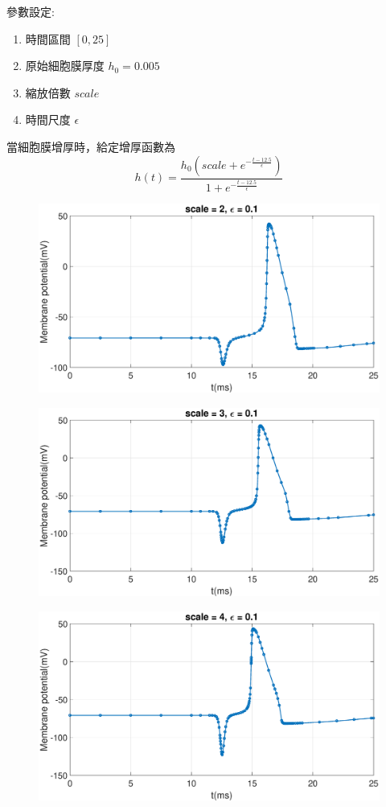 \documentclass[12pt,a4paper]{article}
\begin{document}
	\begin{CJK}{UTF8}{bsmi}
		參數設定: 
		\begin{enumerate}
			\item 時間區間 $[0,25]$
			\item 原始細胞膜厚度 $h_0=0.005$
			\item 縮放倍數 $scale$
			\item 時間尺度 $\epsilon$
		\end{enumerate}
		當細胞膜增厚時，給定增厚函數為
		$$h(t)=\frac{h_0(scale+e^{-\frac{t-12.5}{\epsilon}})}{1+e^{-\frac{t-12.5}{\epsilon}}}$$
		\begin{figure}[htbp]
			\centering
			\includegraphics[width = 500pt]{21.eps}
		\end{figure}
		\begin{figure}[htbp]
			\centering
			\includegraphics[width = 500pt]{31.eps}
		\end{figure}
		\begin{figure}[htbp]
			\centering
			\includegraphics[width = 500pt]{41.eps}

\end{figure}
\end{CJK}
\end{document}
